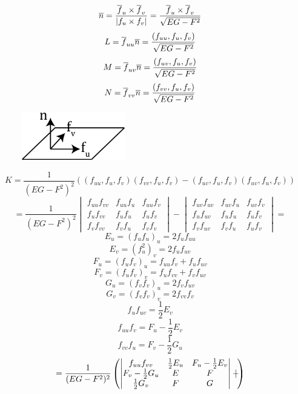 \documentclass[main]{subfiles}
\begin{document}
    \begin{Proof}
        \[\overline{n} = \frac{\overline{f}_u \times \overline{f}_v}{|f_u \times f_v|} = \frac{\overline{f}_u \times \overline{f}_v}{\sqrt{EG - F^2}}\]
        \[L = \overline{f}_{uu} \overline{n} = \frac{(f_{uu}, f_u, f_v)}{\sqrt{EG - F^2}}\]
        \[M = \overline{f}_{uv} \overline{n} = \frac{(f_{uv}, f_u, f_v)}{\sqrt{EG - F^2}}\]
        \[N = \overline{f}_{vv} \overline{n} = \frac{(f_{vv}, f_u, f_v)}{\sqrt{EG - F^2}}\]
        \begin{figure}[H]
            \includegraphics[width=4.5cm]{pics/9_3.png}
            \centering
        \end{figure}
        \[K = \frac{1}{(EG - F^2)^2} ( (f_{uu}, f_u, f_v)(f_{vv}, f_u, f_v) - (f_{uv}, f_u, f_v)(f_{uv}, f_u, f_v) )\]
        \[= \frac{1}{(EG - F^2)^2} \begin{vmatrix}
            f_{uu}f_{vv} & f_{uu}f_{u} & f_{uu}f_{v}\\
            f_{u}f_{vv} & f_{u}f_{u} & f_{u}f_{v}\\
            f_{v}f_{vv} & f_{v}f_{u} & f_{v}f_{v}
        \end{vmatrix} - \begin{vmatrix}
            f_{uv}f_{uv} & f_{uv}f_{u} & f_{uv}f_{v}\\
            f_{u}f_{uv} & f_{u}f_{u} & f_{u}f_{v}\\
            f_{v}f_{uv} & f_{v}f_{u} & f_{u}f_{v}
        \end{vmatrix} =\]
        \[E_u = (f_u f_u)_u = 2 f_u f_{uu}\]
        \[E_v = (f_u^2)_v = 2 f_u f_{uv}\]
        \[F_u = (f_u f_v)_u = f_{uu}f_v + f_u f_{uv}\]
        \[F_v = (f_u f_v)_v = f_u f_{vv} + f_v f_{uv}\]
        \[G_u = (f_v f_v)_u = 2 f_v f_{uv}\]
        \[G_v = (f_v f_v)_v = 2 f_{vv} f_v\]
        \[f_u f_{uv} = \frac{1}{2} E_v\]
        \[f_{uu} f_v = F_u - \frac{1}{2} E_v\]
        \[f_{vv} f_u = F_v - \frac{1}{2} G_u\]
        \[ = \frac{1}{(EG - F^2)^2} \left(\begin{vmatrix}
            f_{uu} f_{vv} & \frac{1}{2} E_u & F_u - \frac{1}{2} E_v\\
            F_v - \frac{1}{2} G_u & E & F\\
            \frac{1}{2} G_v & F & G
        \end{vmatrix} - \begin{vmatrix}

\end{vmatrix}\right)\]
\end{Proof}
\end{document}
